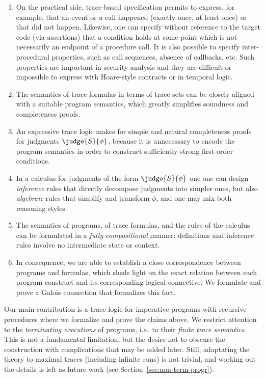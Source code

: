 \documentclass[a4paper,numberwithinsect]{lipics-v2021}
\begin{document}
\begin{enumerate}
\item On the practical side, trace-based specification permits to
  express, for example, that an event or a call happened (exactly
  once, at least once) or that did not happen. Likewise, one can
  specify without reference to the target code (via assertions) that a
  condition holds at some point which is not necessarily an endpoint
  of a procedure call.  It is also possible to specify
  inter-procedural properties, such as call sequences, absence of
  callbacks, etc.  Such properties are important in security analysis
  and they are difficult or impossible to express with Hoare-style
  contracts or in temporal logic.
\item The semantics of trace formulas in terms of trace sets can be
  closely aligned with a suitable program semantics, which greatly
  simplifies soundness and completeness proofs.
\item An expressive trace logic makes for simple and natural
  completeness proofs for judgments $\judge{S}{\phi}$, because it is
  unnecessary to encode the program semantics in order to construct
  sufficiently strong first-order conditions.
\item In a calculus for judgments of the form $\judge{S}{\phi}$ one
  one can design \emph{inference} rules that directly decompose
  judgments into simpler ones, but also \emph{algebraic} rules that
  simplify and transform $\phi$, and one may mix both reasoning
  styles.
\item The semantics of programs, of trace formulas, and the rules of
  the calculus can be formulated in a \emph{fully compositional}
  manner: definitions and inference rules involve no intermediate
  state or context.
\item In consequence, we are able to establish a close
  correspondence between programs and formulas, which sheds light on
  the exact relation between each program construct and its
  corresponding logical connective. We formulate and prove a Galois
  connection that formalizes this fact.
\end{enumerate}

Our main contribution is %
a trace logic for imperative programs with recursive procedures where
we formalize and prove the claims above.
%
We restrict attention to the \emph{terminating executions} of
programs, i.e.~to their \emph{finite trace semantics}. This is not a
fundamental limitation, but the desire not to obscure the construction
with complications that may be added later.
%
Still, adaptating the theory to maximal traces (including infinite runs) 
is not trivial, and working out the details is left as future work
(see Section~\ref{sec:non-term-progr}).
\end{document}
